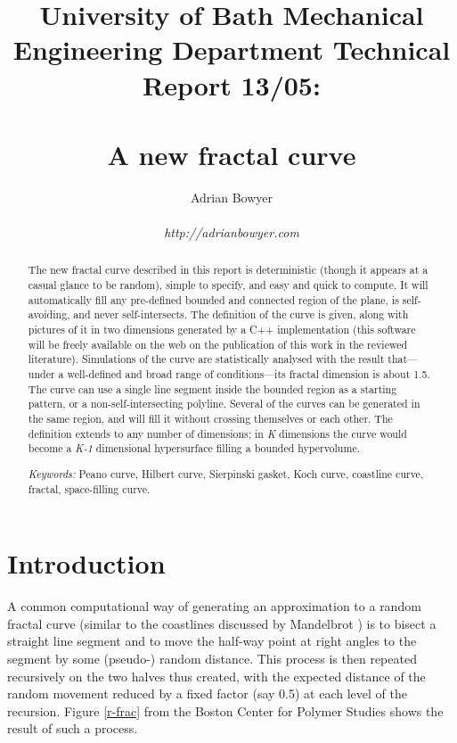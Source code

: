 \documentclass[12pt]{article}
\title{{\Large University of Bath Mechanical Engineering Department 
Technical Report 13/05:}\\~\\{\LARGE A new fractal curve}}
\author{Adrian Bowyer\\
\\
{\em http://adrianbowyer.com}}
\date{\displaydate{date}}
\begin{document}
 

 
\maketitle
 
\begin{abstract}

\noindent
The new fractal curve described in this report is deterministic
(though it appears at a casual glance to be random), simple to
specify, and easy and quick to compute.  It will automatically fill
any pre-defined bounded and connected region of the plane, is
self-avoiding, and never self-intersects.  The definition of the curve
is given, along with pictures of it in two dimensions generated by a
C++ implementation (this software will be freely available on the web
on the publication of this work in the reviewed literature).
Simulations of the curve are statistically analysed with the result
that---under a well-defined and broad range of conditions---its
fractal dimension is about 1.5.  The curve can use a single line
segment inside the bounded region as a starting pattern, or a
non-self-intersecting polyline.  Several of the curves can be
generated in the same region, and will fill it without crossing
themselves or each other.  The definition extends to any number of
dimensions; in {\em K} dimensions the curve would become a {\em K-1}
dimensional hypersurface filling a bounded hypervolume.

\vspace{3mm}
                                                             
\noindent
{\em Keywords:} Peano curve, Hilbert curve, Sierpinski gasket, Koch
curve, coastline curve, fractal, space-filling curve.

\end{abstract}

 
\section*{Introduction}

A common computational way of generating an approximation to a random
fractal curve (similar to the coastlines discussed by Mandelbrot
\cite{mandelbrot}) is to bisect a straight line segment and to move
the half-way point at right angles to the segment by some (pseudo-)
random distance.  This process is then repeated recursively on the two
halves thus created, with the expected distance of the random movement
reduced by a fixed factor (say 0.5) at each level of the recursion.
Figure \ref{r-frac} from the Boston Center for Polymer Studies
\cite{boston-cps} shows the result of such a process.
\end{document}
